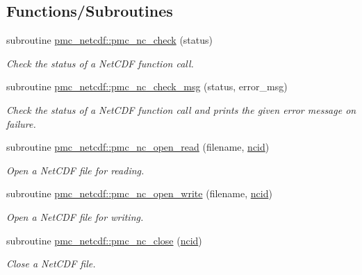 \subsection*{Functions/\+Subroutines}
\begin{DoxyCompactItemize}
\item 
subroutine \mbox{\hyperlink{namespacepmc__netcdf_aeb26885b57dbc718ca9d8a8d4cc1660b}{pmc\+\_\+netcdf\+::pmc\+\_\+nc\+\_\+check}} (status)
\begin{DoxyCompactList}\small\item\em Check the status of a Net\+C\+DF function call. \end{DoxyCompactList}\item 
subroutine \mbox{\hyperlink{namespacepmc__netcdf_a44641c8551b43500185faf232a8b743f}{pmc\+\_\+netcdf\+::pmc\+\_\+nc\+\_\+check\+\_\+msg}} (status, error\+\_\+msg)
\begin{DoxyCompactList}\small\item\em Check the status of a Net\+C\+DF function call and prints the given error message on failure. \end{DoxyCompactList}\item 
subroutine \mbox{\hyperlink{namespacepmc__netcdf_ac9ac86c766cac059b77fb52305ef7258}{pmc\+\_\+netcdf\+::pmc\+\_\+nc\+\_\+open\+\_\+read}} (filename, \mbox{\hyperlink{fractal_8_f90_a4e89f3f850921ff84a6dfce8b166ad50}{ncid}})
\begin{DoxyCompactList}\small\item\em Open a Net\+C\+DF file for reading. \end{DoxyCompactList}\item 
subroutine \mbox{\hyperlink{namespacepmc__netcdf_a10b4e36fc32903e45fad5a03e01cdeb2}{pmc\+\_\+netcdf\+::pmc\+\_\+nc\+\_\+open\+\_\+write}} (filename, \mbox{\hyperlink{fractal_8_f90_a4e89f3f850921ff84a6dfce8b166ad50}{ncid}})
\begin{DoxyCompactList}\small\item\em Open a Net\+C\+DF file for writing. \end{DoxyCompactList}\item 
subroutine \mbox{\hyperlink{namespacepmc__netcdf_afd71cfd565645514fd53dce13a3a5958}{pmc\+\_\+netcdf\+::pmc\+\_\+nc\+\_\+close}} (\mbox{\hyperlink{fractal_8_f90_a4e89f3f850921ff84a6dfce8b166ad50}{ncid}})
\begin{DoxyCompactList}\small\item\em Close a Net\+C\+DF file. \end{DoxyCompactList}\item 

\end{DoxyCompactItemize}
